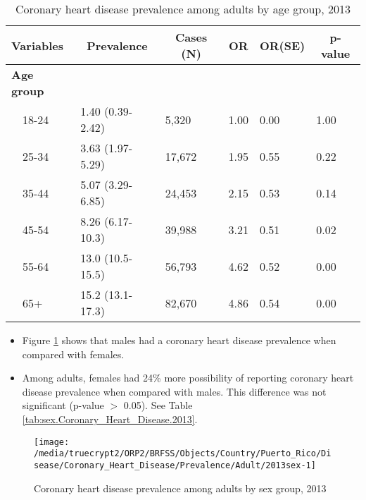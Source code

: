 \begin{table}[H]
\caption{Coronary heart disease prevalence  among adults by age group, 2013\label{tab:age.Coronary_Heart_Disease.2013}} 
\begin{center}
\begin{tabular}{llllll}
\hline\hline
\multicolumn{1}{l}{Variables}&\multicolumn{1}{c}{Prevalence}&\multicolumn{1}{c}{Cases (N)}&\multicolumn{1}{c}{OR}&\multicolumn{1}{c}{OR(SE)}&\multicolumn{1}{c}{p-value}\tabularnewline
\hline
{\bfseries Age group}&&&&&\tabularnewline
~~18-24&1.40 (0.39-2.42)& 5,320&1.00&0.00&1.00\tabularnewline
~~25-34&3.63 (1.97-5.29)&17,672&1.95&0.55&0.22\tabularnewline
~~35-44&5.07 (3.29-6.85)&24,453&2.15&0.53&0.14\tabularnewline
~~45-54&8.26 (6.17-10.3)&39,988&3.21&0.51&0.02\tabularnewline
~~55-64&13.0 (10.5-15.5)&56,793&4.62&0.52&0.00\tabularnewline
~~65+&15.2 (13.1-17.3)&82,670&4.86&0.54&0.00\tabularnewline
\hline
\end{tabular}\end{center}

\end{table}


\newpage
\begin{itemize}

\item Figure \ref{fig:sex.Coronary_Heart_Disease.2013} shows that males had a 
coronary heart disease prevalence when compared with females.


\item Among adults, females had 24\% more possibility of reporting coronary heart disease prevalence when compared with males. This difference was not significant (p-value $>$ 0.05). See Table \ref{tab:sex.Coronary_Heart_Disease.2013}.

\end{itemize}

\begin{figure}[H]
\caption{Coronary heart disease prevalence among adults by sex group, 
2013}
\begin{knitrout}
\color{fgcolor}

{\centering \texttt{[image: /media/truecrypt2/ORP2/BRFSS/Objects/Country/Puerto\_Rico/Disease/Coronary\_Heart\_Disease/Prevalence/Adult/2013sex-1]} 

}



\end{knitrout}
\label{fig:sex.Coronary_Heart_Disease.2013}
\end{figure}

